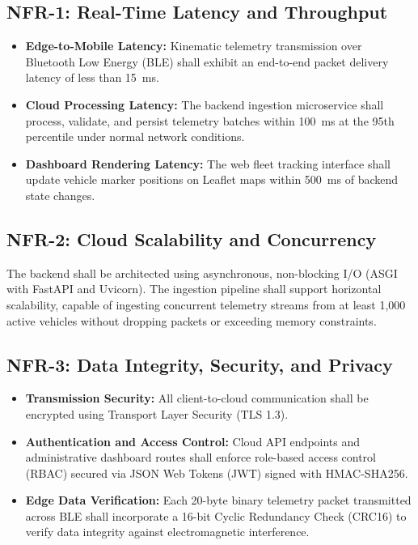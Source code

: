 \subsection{NFR-1: Real-Time Latency and Throughput}
\begin{itemize}
    \item \textbf{Edge-to-Mobile Latency:} Kinematic telemetry transmission over Bluetooth Low Energy (BLE) shall exhibit an end-to-end packet delivery latency of less than 15~ms.
    \item \textbf{Cloud Processing Latency:} The backend ingestion microservice shall process, validate, and persist telemetry batches within 100~ms at the 95th percentile under normal network conditions.
    \item \textbf{Dashboard Rendering Latency:} The web fleet tracking interface shall update vehicle marker positions on Leaflet maps within 500~ms of backend state changes.
\end{itemize}

\subsection{NFR-2: Cloud Scalability and Concurrency}
The backend shall be architected using asynchronous, non-blocking I/O (ASGI with FastAPI and Uvicorn). The ingestion pipeline shall support horizontal scalability, capable of ingesting concurrent telemetry streams from at least 1,000 active vehicles without dropping packets or exceeding memory constraints.

\subsection{NFR-3: Data Integrity, Security, and Privacy}
\begin{itemize}
    \item \textbf{Transmission Security:} All client-to-cloud communication shall be encrypted using Transport Layer Security (TLS 1.3).
    \item \textbf{Authentication and Access Control:} Cloud API endpoints and administrative dashboard routes shall enforce role-based access control (RBAC) secured via JSON Web Tokens (JWT) signed with HMAC-SHA256.
    \item \textbf{Edge Data Verification:} Each 20-byte binary telemetry packet transmitted across BLE shall incorporate a 16-bit Cyclic Redundancy Check (CRC16) to verify data integrity against electromagnetic interference.
\end{itemize}

